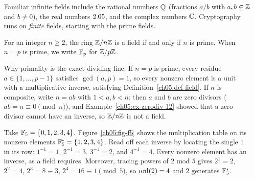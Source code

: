 Familiar infinite fields include the rational numbers $\mathbb{Q}$ (fractions $a/b$ with $a,b \in \mathbb{Z}$ and $b \ne 0$), the real numbers $2.05$, and the complex
numbers $\mathbb{C}$. Cryptography runs on \emph{finite} fields, starting with the prime fields.

\begin{theorem}
\label{ch05:thm-prime-field}
For an integer $n \ge 2$, the ring $\mathbb{Z}/n\mathbb{Z}$ is a field if and only if $n$ is prime. When $n = p$ is prime, we write $\mathbb{F}_p$ for $\mathbb{Z}/p\mathbb{Z}$.
\end{theorem}

\begin{whybox}
Why primality is the exact dividing line. If $n = p$ is prime, every residue
$a \in \{1,\dots,p-1\}$ satisfies $\gcd(a,p)=1$, so every nonzero element is a unit with a multiplicative
inverse, satisfying Definition~\ref{ch05:def-field}. If $n$ is composite, write $n = ab$ with
$1 < a,b < n$; then $a$ and $b$ are zero divisors ($ab = n \equiv 0 \pmod n$), and Example~\ref{ch05:ex-zerodiv-12} showed that a zero divisor cannot have an inverse, so $\mathbb{Z}/n\mathbb{Z}$ is not a field.
\end{whybox}

\begin{example}[$\F_5$ in full]
\label{ch05:ex-f5}
Take $\mathbb{F}_5 = \{0,1,2,3,4\}$. Figure~\ref{ch05:fig-f5} shows the multiplication table on its nonzero elements $\mathbb{F}_5^{*} = \{1,2,3,4\}$. Read off each inverse by locating the single $1$ in its row: $1^{-1}=1$, $2^{-1}=3$, $3^{-1}=2$, and
$4^{-1}=4$. Every nonzero element has an inverse, as a field requires. Moreover, tracing powers of $2$ mod $5$
gives $2^1=2$, $2^2=4$, $2^3=8\equiv 3$, $2^4=16\equiv 1 \pmod 5$, so $\operatorname{ord}(2)=4$ and $2$ generates $\mathbb{F}_5^{*}$.
\end{example}

